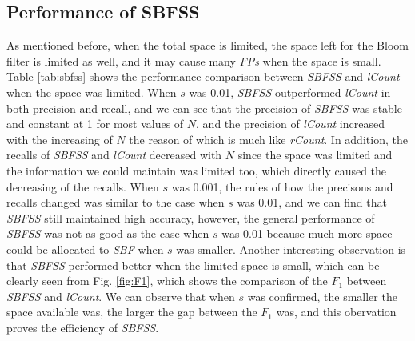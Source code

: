 \documentclass[conference]{IEEEtran}
\begin{document}
\subsection{Performance of SBFSS}
As mentioned before, when the total space is limited, the space left for the Bloom filter is limited as well, and it may cause many \emph{FPs} when the space is small. Table \ref{tab:sbfss} shows the performance comparison between \emph{SBFSS} and \emph{lCount} when the space was limited. When $s$ was 0.01, \emph{SBFSS} outperformed \emph{lCount} in both precision and recall, and we can see that the precision of \emph{SBFSS} was stable and constant at 1 for most values of $N$, and the precision of \emph{lCount} increased with the increasing of $N$ the reason of which is much like \emph{rCount}. In addition, the recalls of \emph{SBFSS} and \emph{lCount} decreased with $N$ since the space was limited and the information we could maintain was limited too, which directly caused the decreasing of the recalls. When $s$ was 0.001, the rules of how the precisons and recalls changed was similar to the case when $s$ was 0.01, and we can find that \emph{SBFSS} still maintained high accuracy, however, the general performance of \emph{SBFSS} was not as good as the case when $s$ was 0.01 because much more space could be allocated to \emph{SBF} when $s$ was smaller. Another interesting observation is that \emph{SBFSS} performed better when the limited space is small, which can be clearly seen from Fig. \ref{fig:F1}, which shows the comparison of the $F_1$ between \emph{SBFSS} and \emph{lCount}. We can observe that when $s$ was confirmed, the smaller the space available was, the larger the gap between the $F_1$ was, and this obervation proves the efficiency of \emph{SBFSS}.
%
%
\end{document}
